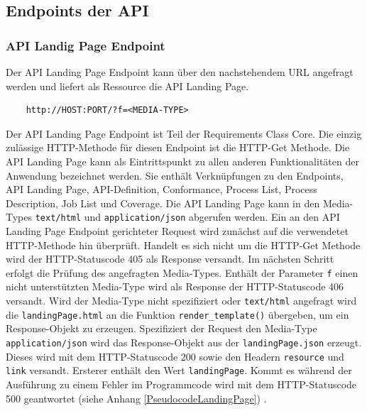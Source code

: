 \subsection{Endpoints der API}
\subsubsection{API Landig Page Endpoint}
Der API Landing Page Endpoint kann über den nachstehendem URL angefragt werden und liefert als Ressource die 
API Landing Page. 
\begin{center}
\begin{BVerbatim}
    http://HOST:PORT/?f=<MEDIA-TYPE>
\end{BVerbatim}
\end{center}
Der API Landing Page Endpoint ist Teil der Requirements Class Core. Die einzig zulässige HTTP-Methode für diesen Endpoint ist die HTTP-Get Methode.
Die API Landing Page kann als Eintrittspunkt zu allen anderen Funktionalitäten der Anwendung bezeichnet werden. Sie enthält Verknüpfungen zu den Endpoints, 
API Landing Page, API-Definition, Conformance, Process List, Process Description, Job List und Coverage.
Die API Landing Page kann in den Media-Types \verb|text/html| und \verb|application/json| abgerufen werden. 
Ein an den API Landing Page Endpoint gerichteter Request wird zunächst auf die verwendetet HTTP-Methode hin überprüft. Handelt es sich nicht um die HTTP-Get 
Methode wird der HTTP-Statuscode 405 als Response versandt. Im nächsten Schritt erfolgt die Prüfung des angefragten Media-Types. Enthält der Parameter \verb|f|
einen nicht unterstützten Media-Type wird als Response der HTTP-Statuscode 406 versandt. Wird der Media-Type nicht spezifiziert oder
\verb|text/html| angefragt wird die \verb|landingPage.html| an die Funktion \verb|render_template()| übergeben, um ein Response-Objekt zu erzeugen. Spezifiziert der Request 
den Media-Type \verb|application/json| wird das Response-Objekt aus der \verb|landingPage.json| erzeugt. Dieses wird mit dem HTTP-Statuscode 200 sowie den Headern
\verb|resource| und \verb|link| versandt. Ersterer enthält den Wert \verb|landingPage|.
Kommt es während der Ausführung zu einem Fehler im Programmcode wird mit dem HTTP-Statuscode 500 geantwortet
(siehe Anhang \ref{PseudocodeLandingPage}) \cite{code,ogc_api_processes_core}. 

